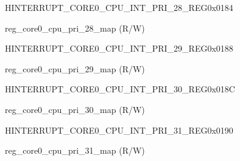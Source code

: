 \begin{register}{H}{INTERRUPT\_CORE0\_CPU\_INT\_PRI\_28\_REG}{0x0184}\label{regdesc:INTERRUPTCORE0CPUINTPRI28REG}
%
%
\regnewline%
\begin{regdesc}\begin{reglist}
\label{fielddesc:INTERRUPTCORE0CPUPRI28MAP}\item [INTERRUPT\_CORE0\_CPU\_PRI\_28\_MAP] reg\_core0\_cpu\_pri\_28\_map (R/W)
\end{reglist}\end{regdesc}
\end{register}


\begin{register}{H}{INTERRUPT\_CORE0\_CPU\_INT\_PRI\_29\_REG}{0x0188}\label{regdesc:INTERRUPTCORE0CPUINTPRI29REG}
%
%
\regnewline%
\begin{regdesc}\begin{reglist}
\label{fielddesc:INTERRUPTCORE0CPUPRI29MAP}\item [INTERRUPT\_CORE0\_CPU\_PRI\_29\_MAP] reg\_core0\_cpu\_pri\_29\_map (R/W)
\end{reglist}\end{regdesc}
\end{register}


\begin{register}{H}{INTERRUPT\_CORE0\_CPU\_INT\_PRI\_30\_REG}{0x018C}\label{regdesc:INTERRUPTCORE0CPUINTPRI30REG}
%
%
\regnewline%
\begin{regdesc}\begin{reglist}
\label{fielddesc:INTERRUPTCORE0CPUPRI30MAP}\item [INTERRUPT\_CORE0\_CPU\_PRI\_30\_MAP] reg\_core0\_cpu\_pri\_30\_map (R/W)
\end{reglist}\end{regdesc}
\end{register}


\begin{register}{H}{INTERRUPT\_CORE0\_CPU\_INT\_PRI\_31\_REG}{0x0190}\label{regdesc:INTERRUPTCORE0CPUINTPRI31REG}
%
%
\regnewline%
\begin{regdesc}\begin{reglist}
\label{fielddesc:INTERRUPTCORE0CPUPRI31MAP}\item [INTERRUPT\_CORE0\_CPU\_PRI\_31\_MAP] reg\_core0\_cpu\_pri\_31\_map (R/W)
\end{reglist}\end{regdesc}
\end{register}


